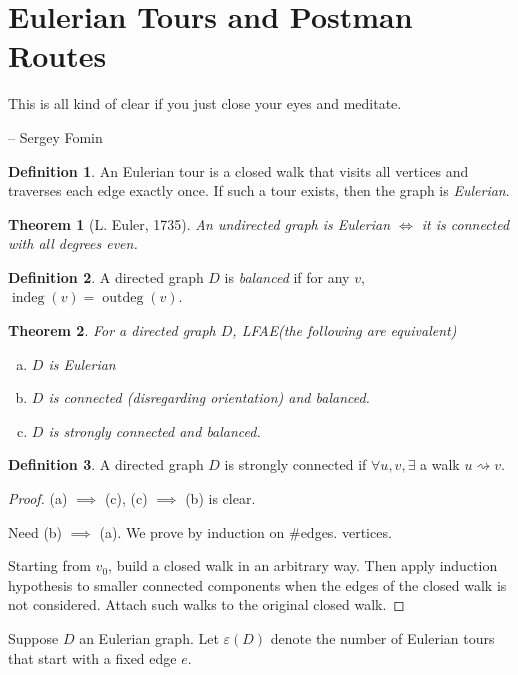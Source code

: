 \documentclass{report}
\newtheorem{theorem}{Theorem}[section]
\theoremstyle{definition}
\newtheorem{definition}{Definition}[section]
\theoremstyle{remark}
\numberwithin{equation}{section}
\begin{document}
\section{Eulerian Tours and Postman Routes}
\epigraph{This is all kind of clear if you just close your eyes and meditate.}{-- \textup{Sergey Fomin}}
\begin{definition}
    An Eulerian tour is a closed walk that visits all vertices and traverses each edge exactly once. If such a tour exists, then the graph is \emph{Eulerian}.
\end{definition}
\begin{theorem}[L. Euler, 1735] An undirected graph is Eulerian $\iff$ it is connected with all degrees even.
\end{theorem}
\begin{definition}
    A directed graph $D$ is \emph{balanced} if for any $v$, $\operatorname{indeg}(v) = \operatorname{outdeg}(v)$.
\end{definition}
\begin{theorem}
    For a directed graph $D$, LFAE(the following are equivalent)
    \begin{enumerate}[(a)]
        \item $D$ is Eulerian
        \item $D$ is connected (disregarding orientation) and balanced.
        \item $D$ is strongly connected and balanced.
    \end{enumerate}
\end{theorem}
\begin{definition}
    A directed graph $D$ is strongly connected if $\forall u, v, \exists$ a walk $u \rightsquigarrow v$.
\end{definition}
\begin{proof}
    (a) $\implies$ (c), (c) $\implies$ (b) is clear.

    Need (b) $\implies$ (a). We prove by induction on $\#$edges. vertices.

    Starting from $v_0$, build a closed walk in an arbitrary way. Then apply induction hypothesis to smaller connected components when the edges of the closed walk is not considered. Attach such walks to the original closed walk.
\end{proof}

Suppose $D$ an Eulerian graph. Let $\varepsilon(D)$ denote the number of Eulerian tours that start with a fixed edge $e$.
\end{document}
